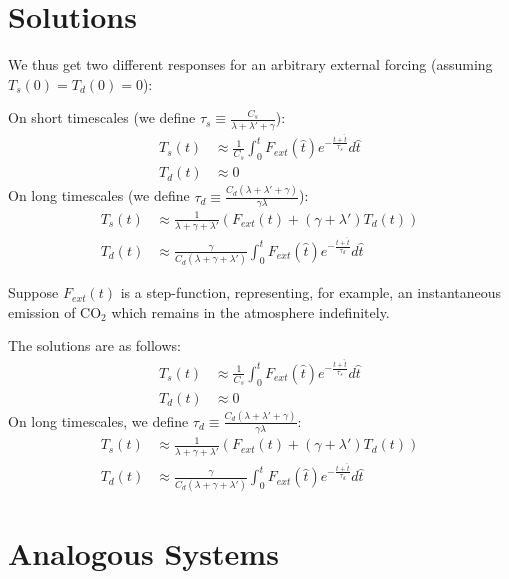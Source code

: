 \section{Solutions}\label{Dynamical Systems Solutions}

We thus get two different responses for an arbitrary external forcing (assuming $T_s(0)=T_d(0)=0$):\vspace{5 mm}

\noindent On short timescales (we define $\tau_s\equiv\frac{C_s}{\lambda+\lambda'+\gamma}$): 
\begin{align}
    T_s(t) & \approx \frac{1}{C_s}\int_0^tF_{ext}(\hat{t}) e^{-\frac{t+\hat{t}}{\tau_s}}d\hat{t} \label{T_s short soln} \\ 
    T_d(t)& \approx 0 \label{T_d short soln}
\end{align}
On long timescales (we define $\tau_d\equiv\frac{C_d(\lambda+\lambda'+\gamma)}{\gamma\lambda}$):
\begin{align}
    T_s(t) & \approx \frac{1}{\lambda+\gamma+\lambda'}\left(F_{ext}(t)+(\gamma+\lambda ')T_d(t)\right) \\ 
    T_d(t) & \approx \frac{\gamma}{C_d(\lambda+\gamma+\lambda')}\int_0^tF_{ext}(\hat{t}) e^{-\frac{t+\hat{t}}{\tau_d}}d\hat{t}  \label{T_d long step soln}
\end{align}

Suppose $F_{ext}(t)$ is a step-function, representing, for example, an instantaneous emission of CO$_2$ which remains in the atmosphere indefinitely.

The solutions are as follows: 
\begin{align}
    T_s(t) & \approx \frac{1}{C_s}\int_0^tF_{ext}(\hat{t}) e^{-\frac{t+\hat{t}}{\tau_s}}d\hat{t}  \\ 
    T_d(t)& \approx 0 
\end{align}
On long timescales, we define $\tau_d\equiv\frac{C_d(\lambda+\lambda'+\gamma)}{\gamma\lambda}$:
\begin{align}
    T_s(t) & \approx \frac{1}{\lambda+\gamma+\lambda'}\left(F_{ext}(t)+(\gamma+\lambda ')T_d(t)\right) \\ 
    T_d(t) & \approx \frac{\gamma}{C_d(\lambda+\gamma+\lambda')}\int_0^tF_{ext}(\hat{t}) e^{-\frac{t+\hat{t}}{\tau_d}}d\hat{t}  \label{T_d long soln}
\end{align}

\section{Analogous Systems}

